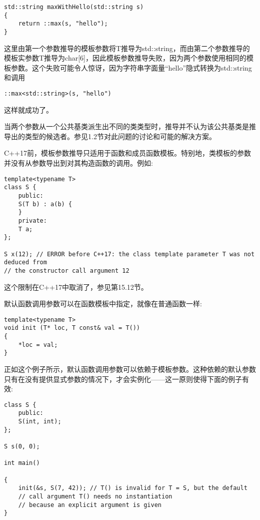 \begin{lstlisting}[style=styleCXX]
std::string maxWithHello(std::string s)
{
	return ::max(s, "hello");
}
\end{lstlisting}

这里由第一个参数推导的模板参数将T推导为std::string，而由第二个参数推导的模板实参数T推导为char[6]，因此模板参数推导失败，因为两个参数使用相同的模板参数。这个失败可能令人惊讶，因为字符串字面量“hello”隐式转换为std::string和调用

\begin{lstlisting}[style=styleCXX]
::max<std::string>(s, "hello")
\end{lstlisting}

这样就成功了。

当两个参数从一个公共基类派生出不同的类类型时，推导并不认为该公共基类是推导出的类型的候选者。参见1.2节对此问题的讨论和可能的解决方案。


C++17前，模板参数推导只适用于函数和成员函数模板。特别地，类模板的参数并没有从参数导出到对其构造函数的调用。例如:

\begin{lstlisting}[style=styleCXX]
template<typename T>
class S {
	public:
	S(T b) : a(b) {
	}
	private:
	T a;
};

S x(12); // ERROR before C++17: the class template parameter T was not deduced from
// the constructor call argument 12
\end{lstlisting}

这个限制在C++17中取消了，参见第15.12节。


默认函数调用参数可以在函数模板中指定，就像在普通函数一样:

\begin{lstlisting}[style=styleCXX]
template<typename T>
void init (T* loc, T const& val = T())
{
	*loc = val;
}
\end{lstlisting}

正如这个例子所示，默认函数调用参数可以依赖于模板参数。这种依赖的默认参数只有在没有提供显式参数的情况下，才会实例化——这一原则使得下面的例子有效:

\begin{lstlisting}[style=styleCXX]
class S {
	public:
	S(int, int);
};

S s(0, 0);

int main()

{
	init(&s, S(7, 42)); // T() is invalid for T = S, but the default
	// call argument T() needs no instantiation
	// because an explicit argument is given
}
\end{lstlisting}

